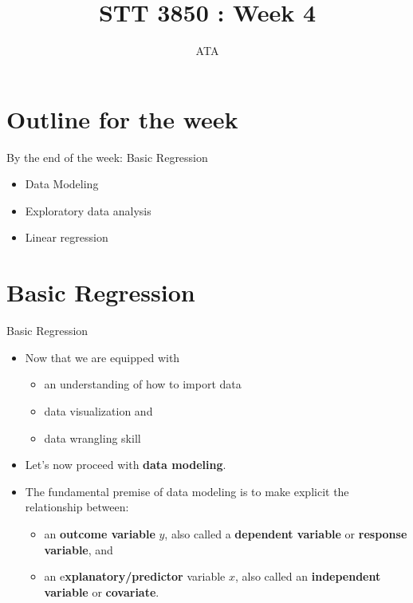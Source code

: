 \documentclass[
  ignorenonframetext,
]{beamer}
\title{\texorpdfstring{STT 3850 : Week 4}{STT 3850 : Week 4}}
\author{\texorpdfstring{ATA}{ATA}}
\date{}
\institute{Appalachian State University}
\providecommand{\tightlist}{%
  \setlength{\itemsep}{0pt}\setlength{\parskip}{0pt}}
\begin{document}
\frame{\titlepage}

\section{Outline for the week}\label{outline-for-the-week}

\begin{frame}{By the end of the week: Basic Regression}
\protect{}\label{by-the-end-of-the-week-basic-regression}
\begin{itemize}
\tightlist
\item
  Data Modeling
\item
  Exploratory data analysis
\item
  Linear regression
\end{itemize}
\end{frame}

\section{Basic Regression}\label{basic-regression}

\begin{frame}{Basic Regression}
\protect{}\label{basic-regression-1}
\begin{itemize}
\item
  Now that we are equipped with

  \begin{itemize}
  \tightlist
  \item
    an understanding of how to import data
  \item
    data visualization and
  \item
    data wrangling skill
  \end{itemize}
\item
  Let's now proceed with \textbf{data modeling}.
\item
  The fundamental premise of data modeling is to make explicit the
  relationship between:

  \begin{itemize}
  \tightlist
  \item
    an \textbf{outcome variable} \(y\), also called a \textbf{dependent
    variable} or \textbf{response variable}, and
  \item
    an e\textbf{xplanatory/predictor} variable \(x\), also called an
    \textbf{independent variable} or \textbf{covariate}.
  \end{itemize}
\end{itemize}
\end{frame}
\end{document}
